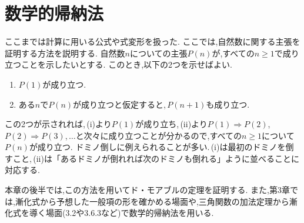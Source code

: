 
  \section{数学的帰納法}
    ここまでは計算に用いる公式や式変形を扱った. ここでは,自然数に関する主張を証明する方法を説明する.
    自然数$n$についての主張$P(n)$が,すべての$n\ge1$で成り立つことを示したいとする.
    このとき,以下の2つを示せばよい.
    \begin{enumerate}[label=(\roman*),parsep=3pt]
      \item $P(1)$が成り立つ.
      \item ある$n$で$P(n)$が成り立つと仮定すると,\,$P(n+1)$も成り立つ.
    \end{enumerate}
    この2つが示されれば,\,(i)より$P(1)$が成り立ち,\,(ii)より$P(1)\Rightarrow P(2)$,\,$P(2)\Rightarrow P(3)$,\,$\ldots$と次々に成り立つことが分かるので,すべての$n\ge1$について$P(n)$が成り立つ.
    ドミノ倒しに例えられることが多い.\,(i)は最初のドミノを倒すこと,\,(ii)は「あるドミノが倒れれば次のドミノも倒れる」ように並べることに対応する.

    本章の後半では,この方法を用いてド・モアブルの定理を証明する.
    また,第3章では,漸化式から予想した一般項の形を確かめる場面や,三角関数の加法定理から漸化式を導く場面(3.2や3.6.3など)で数学的帰納法を用いる.